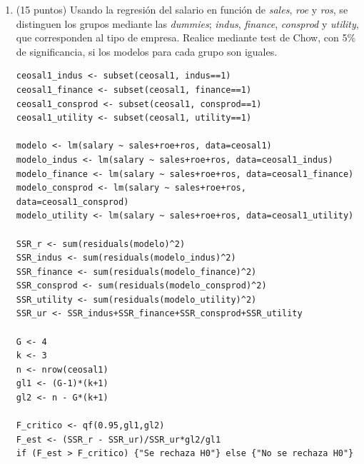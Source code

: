 \documentclass[letterpaper,11pt]{article}
\begin{document}
\begin{enumerate}
\begin{lstlisting}
modelo <- lm(salary ~ sales+roe+ros+sales_mayor_promedio+sales_D+ roe_D+ros_D, data=ceosal1)
summary(modelo)

F_critico <- qf(0.95, 4,201)
R2_ur <- 0.06028
R2_r <- 0.03191
F_est <- (R2_ur-R2_r)/(1-R2_ur)*201/4
if (F_est>F_critico) {"Se rechaza H0"} else {"No se rechaza H0"}
\end{lstlisting}

\item (15 puntos) Usando la regresión del salario en función de \textit{sales}, \textit{roe} y \textit{ros}, se distinguen los grupos mediante las \textit{dummies}; \textit{indus}, \textit{finance}, \textit{consprod} y \textit{utility}, que corresponden al tipo de empresa. Realice mediante test de Chow, con 5\% de significancia, si los modelos para cada grupo son iguales. 
\begin{lstlisting}
ceosal1_indus <- subset(ceosal1, indus==1)
ceosal1_finance <- subset(ceosal1, finance==1)
ceosal1_consprod <- subset(ceosal1, consprod==1)
ceosal1_utility <- subset(ceosal1, utility==1)

modelo <- lm(salary ~ sales+roe+ros, data=ceosal1)
modelo_indus <- lm(salary ~ sales+roe+ros, data=ceosal1_indus)
modelo_finance <- lm(salary ~ sales+roe+ros, data=ceosal1_finance)
modelo_consprod <- lm(salary ~ sales+roe+ros, data=ceosal1_consprod)
modelo_utility <- lm(salary ~ sales+roe+ros, data=ceosal1_utility)

SSR_r <- sum(residuals(modelo)^2)
SSR_indus <- sum(residuals(modelo_indus)^2)
SSR_finance <- sum(residuals(modelo_finance)^2)
SSR_consprod <- sum(residuals(modelo_consprod)^2)
SSR_utility <- sum(residuals(modelo_utility)^2)
SSR_ur <- SSR_indus+SSR_finance+SSR_consprod+SSR_utility

G <- 4
k <- 3
n <- nrow(ceosal1)
gl1 <- (G-1)*(k+1)
gl2 <- n - G*(k+1)

F_critico <- qf(0.95,gl1,gl2)
F_est <- (SSR_r - SSR_ur)/SSR_ur*gl2/gl1
if (F_est > F_critico) {"Se rechaza H0"} else {"No se rechaza H0"}
\end{lstlisting}


\end{enumerate}
\end{document}
